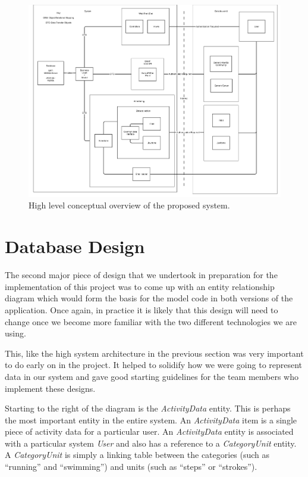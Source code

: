 \begin{figure}[H]
\centering
\includegraphics[width=1.0\textwidth]{../design/system/groupproject_systemarchitecture.png}
\caption{High level conceptual overview of the proposed system.}
\label{fig:system-architecture}
\end{figure}

\section{Database Design}
The second major piece of design that we undertook in preparation for the implementation of this project was to come up with an entity relationship diagram which would form the basis for the model code in both versions of the application. Once again, in practice it is likely that this design will need to change once we become more familiar with the two different technologies we are using.

This, like the high system architecture in the previous section was very important to do early on in the project. It helped to solidify how we were going to represent data in our system and gave good starting guidelines for the team members who implement these designs.

Starting to the right of the diagram is the \textit{ActivityData} entity. This is perhaps the most important entity in the entire system. An \textit{ActivityData} item is a single piece of activity data for a particular user. An \textit{ActivityData} entity is associated with a particular system \textit{User} and also has a reference to a \textit{CategoryUnit} entity. A \textit{CategoryUnit} is simply a linking table between the categories (such as ``running'' and ``swimming'') and units (such as ``steps'' or ``strokes'').

